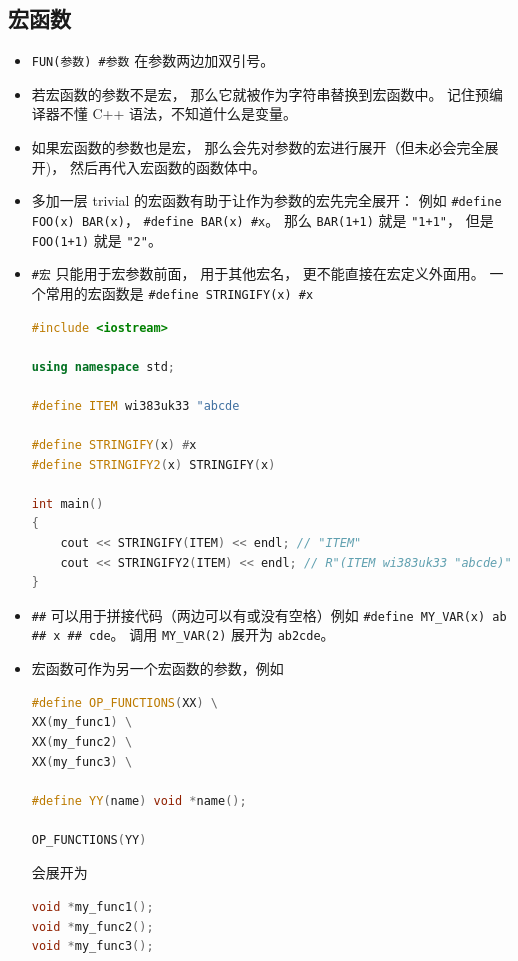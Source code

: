 \subsection{宏函数}
\begin{itemize}
\item \verb`FUN(参数) #参数` 在参数两边加双引号。
\item 若宏函数的参数不是宏， 那么它就被作为字符串替换到宏函数中。 记住预编译器不懂 C++ 语法，不知道什么是变量。
\item 如果宏函数的参数也是宏， 那么会先对参数的宏进行展开（但未必会完全展开)， 然后再代入宏函数的函数体中。
\item 多加一层 trivial 的宏函数有助于让作为参数的宏先完全展开： 例如 \verb`#define FOO(x) BAR(x)`， \verb`#define BAR(x) #x`。 那么 \verb`BAR(1+1)` 就是 \verb`"1+1"`， 但是 \verb`FOO(1+1)` 就是 \verb`"2"`。
\item \verb`#宏` 只能用于宏参数前面， 用于其他宏名， 更不能直接在宏定义外面用。 一个常用的宏函数是 \verb`#define STRINGIFY(x) #x`
\begin{lstlisting}[language=cpp]
#include <iostream>

using namespace std;

#define ITEM wi383uk33 "abcde

#define STRINGIFY(x) #x
#define STRINGIFY2(x) STRINGIFY(x)

int main()
{
	cout << STRINGIFY(ITEM) << endl; // "ITEM"
	cout << STRINGIFY2(ITEM) << endl; // R"(ITEM wi383uk33 "abcde)"
}
\end{lstlisting}
\item \verb`##` 可以用于拼接代码（两边可以有或没有空格）例如 \verb`#define MY_VAR(x) ab ## x ## cde`。 调用 \verb`MY_VAR(2)` 展开为 \verb`ab2cde`。
\item 宏函数可作为另一个宏函数的参数，例如
\begin{lstlisting}[language=cpp]
#define OP_FUNCTIONS(XX) \
XX(my_func1) \
XX(my_func2) \
XX(my_func3) \

#define YY(name) void *name();

OP_FUNCTIONS(YY)
\end{lstlisting}
会展开为
\begin{lstlisting}[language=cpp]
void *my_func1();
void *my_func2();
void *my_func3();
\end{lstlisting}
\end{itemize}

